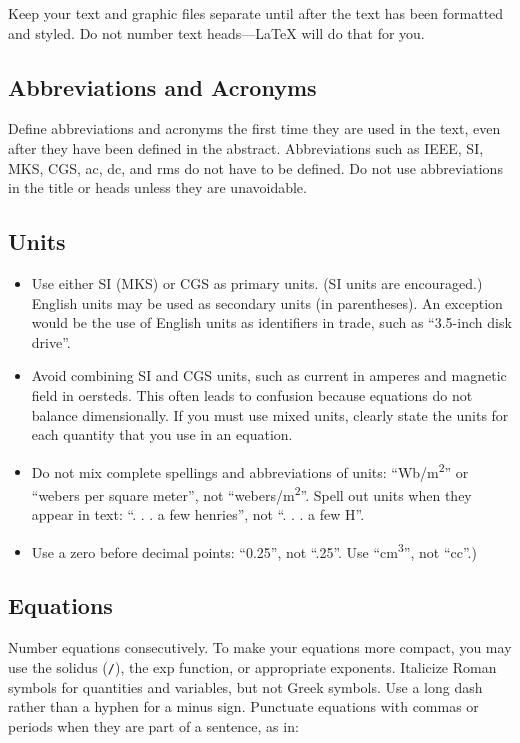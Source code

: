 \documentclass[conference]{IEEEtran}
\begin{document}
Keep your text and graphic files separate until after the text has been formatted and styled. Do not number text heads---\LaTeX{} will do that for you.

\subsection{Abbreviations and Acronyms}
\label{sec:org78c92c2}
   Define abbreviations and acronyms the first time they are used in the text, even after they have been defined in the abstract. Abbreviations such as IEEE, SI, MKS, CGS, ac, dc, and rms do not have to be defined. Do not use 
abbreviations in the title or heads unless they are unavoidable.

\subsection{Units}
\label{sec:orgcb2c6db}
\begin{itemize}
\item Use either SI (MKS) or CGS as primary units. (SI units are encouraged.) English units may be used as secondary units (in parentheses). An exception would be the use of English units as identifiers in trade, such as ``3.5-inch disk drive''.
\item Avoid combining SI and CGS units, such as current in amperes and magnetic field in oersteds. This often leads to confusion because equations do not balance dimensionally. If you must use mixed units, clearly state the units for each quantity that you use in an equation.
\item Do not mix complete spellings and abbreviations of units: ``Wb/m\textsuperscript{2}'' or ``webers per square meter'', not ``webers/m\textsuperscript{2}''. Spell out units when they appear in text: ``. . . a few henries'', not ``. . . a few H''.
\item Use a zero before decimal points: ``0.25'', not ``.25''. Use ``cm\textsuperscript{3}'', not ``cc''.)
\end{itemize}

\subsection{Equations}
\label{sec:org237f87f}
   Number equations consecutively. To make your equations more compact, you may use the solidus (\texttt{/}), the exp function, or 
appropriate exponents. Italicize Roman symbols for quantities and variables, but not Greek symbols. Use a long dash rather than a hyphen for a minus sign. Punctuate equations with commas or periods when they are part of a 
sentence, as in:
\end{document}
